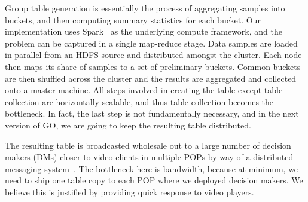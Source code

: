  Group table generation is essentially the process of aggregating samples into buckets, and then computing summary statistics for each bucket.  Our implementation uses Spark~\cite{} as the underlying compute framework, and the problem can be captured in a single map-reduce stage. Data samples are loaded in parallel from an HDFS source and distributed amongst the cluster. Each node then maps its share of samples to a set of preliminary buckets. Common buckets are then shuffled across the cluster and the results are aggregated and collected onto a master machine. All steps involved in creating the table except table collection are horizontally scalable, and thus table collection becomes the bottleneck. In fact, the last step is not fundamentally necessary, and in the next version of GO, we are going to keep the resulting table distributed.

 The resulting table is broadcasted wholesale out to a large number of decision makers (DMs) closer to video clients in multiple POPs by way of a distributed messaging system~\cite{kafka}. The bottleneck here is bandwidth, because at minimum, we need to ship one table copy to each POP where we deployed decision makers. We believe this is justified by providing quick response to video players.


